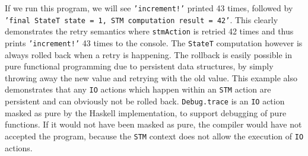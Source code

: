 \medskip %

If we run this program, we will see \texttt{'increment!'} printed 43 times, followed by \texttt{'final StateT state = 1, STM computation result = 42'}. This clearly demonstrates the retry semantics where \texttt{stmAction} is retried 42 times and thus prints \texttt{'increment!'} 43 times to the console. The \texttt{StateT} computation however is always rolled back when a retry is happening. The rollback is easily possible in pure functional programming due to persistent data structures, by simply throwing away the new value and retrying with the old value. This example also demonstrates that any \texttt{IO} actions which happen within an \texttt{STM} action are persistent and can obviously not be rolled back. \texttt{Debug.trace} is an \texttt{IO} action masked as pure by the Haskell implementation, to support debugging of pure functions. If it would not have been masked as pure, the compiler would have not accepted the program, because the \texttt{STM} context does not allow the execution of \texttt{IO} actions.